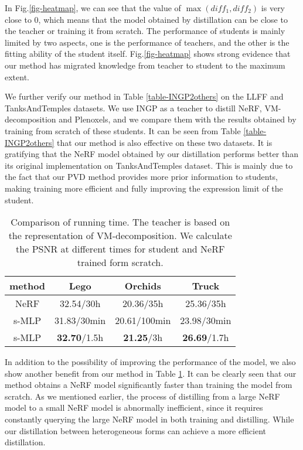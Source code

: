 \documentclass[letterpaper]{article} \usepackage{aaai23}  \usepackage{times}  \usepackage{helvet}  \usepackage{courier}  \usepackage[hyphens]{url}  \usepackage{graphicx} \urlstyle{rm} \def\UrlFont{\rm}  \usepackage{natbib}  \usepackage{caption} \frenchspacing  \setlength{\pdfpagewidth}{8.5in}  \setlength{\pdfpageheight}{11in}  \usepackage{multirow}
\begin{document}
In Fig.\ref{fig-heatmap}, we can see that the value of $\max(diff_{1}, diff_{2})$ is very close to 0, which means that the model obtained by distillation can be close to the teacher or training it from scratch. The performance of students is mainly limited by two aspects, one is the performance of teachers, and the other is the fitting ability of the student itself. Fig.\ref{fig-heatmap} shows strong evidence that our method has migrated knowledge from teacher to student to the maximum extent.


We further verify our method in Table \ref{table-INGP2others} on the LLFF and TanksAndTemples datasets. We use INGP as a teacher to distill NeRF, VM-decomposition and Plenoxels, and we compare them with the results obtained by training from scratch of these students. It can be seen from Table \ref{table-INGP2others} that our method is also effective on these two datasets. It is gratifying that the NeRF model obtained by our distillation performs better than its original implementation on TanksAndTemples dataset. This is mainly due to the fact that our PVD method provides more prior information to students, making training more efficient and fully improving the expression limit of the student.
\begin{table}[ht]
\begin{tabular}{cccc}
\hline
method & Lego                 & Orchids               & Truck                \\ \hline
NeRF   & 32.54/30h            & 20.36/35h             & 25.36/35h            \\
s-MLP  & 31.83/30min          & 20.61/100min          & 23.98/30min          \\
s-MLP  & \textbf{32.70}/1.5h & \textbf{21.25}/3h & \textbf{26.69}/1.7h \\ \hline
\end{tabular}
\caption{Comparison of running time. The teacher is based on the representation of VM-decomposition. We calculate the PSNR at different times for student and NeRF trained form scratch.}
\label{table-time}
\end{table}
 In addition to the possibility of improving the performance of the model, we also show another benefit from our method in Table \ref{table-time}. It can be clearly seen that our method obtains a NeRF model significantly faster than training the model from scratch. As we mentioned earlier, the process of distilling from a large NeRF model to a small NeRF model is abnormally inefficient, since it requires constantly querying the large NeRF model in both training and distilling. While our distillation between heterogeneous forms can achieve a more efficient distillation.
\end{document}
